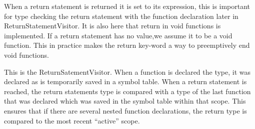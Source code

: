 When a return statement is returned it is set to its expression, this is important for type checking the return statement with the function declaration later in ReturnStatementVisitor.
It is also here that return in void functions is implemented. If a return statement has no value,we assume it to be a void function. This in practice makes the return key-word a way to preemptively end void functions.
\begin{figure}[H]
\centering
{}
\caption{}
\label{lf05}
\end{figure}
This is the ReturnSatementVisitor. When a function is declared the type, it was declared as is temporarily saved in a symbol table. When a return statement is reached, the return statements type is compared with a type of the last function that was declared which was saved in the symbol table within that scope. This ensures that if there are several nested function declarations, the return type is compared to the most recent “active” scope.
\begin{figure}[H]
\centering
{}
\caption{}
\label{lf05}
\end{figure}
 \begin{figure}[H]
\centering
{}
\caption{}
\label{lf05}
\end{figure}


